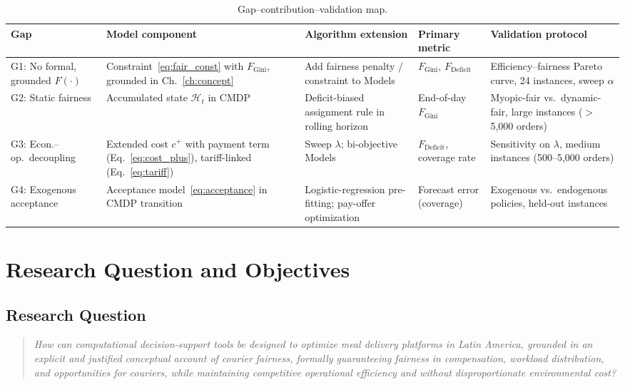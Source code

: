 \documentclass[12pt,a4paper]{report}
\begin{document}
\begin{table}[ht]
\centering
\caption{Gap--contribution--validation map.}
\label{tab:gap_map}
\small
\begin{tabularx}{\textwidth}{p{1.4cm}p{2.8cm}p{2.5cm}p{2.2cm}p{3.5cm}}
\toprule
\textbf{Gap} & \textbf{Model component} & \textbf{Algorithm extension} &
\textbf{Primary metric} & \textbf{Validation protocol} \\
\midrule
G1: No formal, grounded $F(\cdot)$ &
  Constraint~\eqref{eq:fair_const} with $F_\text{Gini}$, grounded in Ch.~\ref{ch:concept} &
  Add fairness penalty / constraint to Models &
  $F_\text{Gini}$, $F_\text{Deficit}$ &
  Efficiency--fairness Pareto curve, 24 instances, sweep $\alpha$ \\
\midrule
G2: Static fairness &
  Accumulated state $\mathcal{H}_t$ in CMDP &
  Deficit-biased assignment rule in rolling horizon &
  End-of-day $F_\text{Gini}$ &
  Myopic-fair vs.\ dynamic-fair, large instances ($>$5{,}000 orders) \\
\midrule
G3: Econ.--op.\ decoupling &
  Extended cost $c^+$ with payment term (Eq.~\ref{eq:cost_plus}), tariff-linked (Eq.~\ref{eq:tariff}) &
  Sweep $\lambda$; bi-objective Models &
  $F_\text{Deficit}$, coverage rate &
  Sensitivity on $\lambda$, medium instances (500--5{,}000 orders) \\
\midrule
G4: Exogenous acceptance &
  Acceptance model~\eqref{eq:acceptance} in CMDP transition &
  Logistic-regression pre-fitting; pay-offer optimization &
  Forecast error (coverage) &
  Exogenous vs.\ endogenous policies, held-out instances \\
\bottomrule
\end{tabularx}
\end{table}


\chapter{Research Question and Objectives}
\label{ch:objectives}
\label{sec:objectives}

\section{Research Question}
\label{sec:research-question}

\begin{quote}
\itshape
How can computational decision-support tools be designed to optimize meal delivery platforms in Latin America, grounded in an explicit and justified conceptual account of courier fairness, formally guaranteeing fairness in compensation, workload distribution, and opportunities for couriers, while maintaining competitive operational efficiency and without disproportionate environmental cost?
\end{quote}
\end{document}

